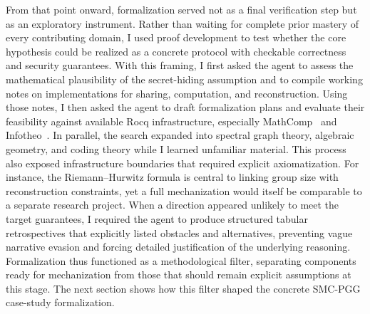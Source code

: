 \documentclass[11pt,a4paper]{article}
\begin{document}
From that point onward, formalization served not as a final verification step
but as an exploratory instrument. Rather than waiting for complete prior
mastery of every contributing domain, I used proof development to test whether
the core hypothesis could be realized as a concrete protocol with checkable
correctness and security guarantees.
With this framing, I first asked the agent to assess the mathematical
plausibility of the secret-hiding assumption and to compile working notes on
implementations for sharing, computation, and reconstruction. Using those
notes, I then asked the agent to draft formalization plans and evaluate their
feasibility against available Rocq infrastructure, especially
MathComp~\cite{MathComp} and Infotheo~\cite{InfoTheo}. In parallel, the search
expanded into spectral graph theory, algebraic geometry, and coding theory
while I learned unfamiliar material.
This process also exposed infrastructure boundaries that required explicit
axiomatization. For instance, the Riemann--Hurwitz formula is central to
linking group size with reconstruction constraints, yet a full mechanization
would itself be comparable to a separate research project. When a direction
appeared unlikely to meet the target guarantees, I required the agent to
produce structured tabular retrospectives that explicitly listed obstacles and
alternatives, preventing vague narrative evasion and forcing detailed
justification of the underlying reasoning.
Formalization thus functioned as a methodological filter, separating components
ready for mechanization from those that should remain explicit assumptions at
this stage. The next section shows how this filter shaped the concrete SMC-PGG
case-study formalization.


%
\end{document}
